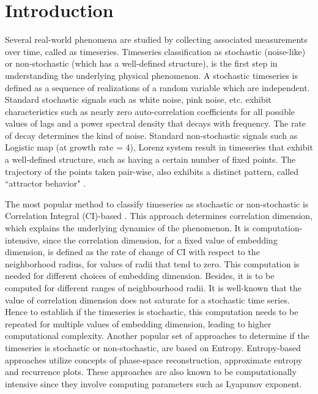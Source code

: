 \documentclass[journal]{IEEEtran}
\begin{document}
	\section{Introduction}
	Several real-world phenomena are studied by collecting associated measurements over time, called as timeseries. Timeseries classification as stochastic (noise-like) or non-stochastic (which has a well-defined structure), is the first step in understanding the underlying physical phenomenon. A stochastic timeseries is defined as a sequence of realizations of a random variable which are independent. Standard stochastic signals such as white noise, pink noise, etc. exhibit characteristics such as nearly zero auto-correlation coefficients for all possible values of lags and a power spectral density that decays with frequency. The rate of decay determines the kind of noise.  Standard non-stochastic signals such as Logistic map (at growth rate = 4), Lorenz system result in timeseries that exhibit a well-defined structure, such as having a certain number of fixed points. The trajectory of the points taken  pair-wise, also exhibits a distinct pattern, called ``attractor behavior" \cite{CIGRacia}.
	
	
	The most popular method to classify timeseries as stochastic or non-stochastic is Correlation Integral (CI)-based \cite{CIGRacia}. This approach determines correlation dimension, which explains the underlying dynamics of the phenomenon. It is computation-intensive, since the correlation dimension, for a fixed value of embedding dimension, is defined as the rate of change of CI with respect to the neighborhood radius, for values of radii that tend to zero. This computation is needed for different choices of embedding dimension. Besides, it is to be computed for  different ranges of neighbourhood radii. It is well-known that the value of correlation dimension does not saturate for a stochastic time series. Hence to establish if the timeseries is stochastic, this computation needs to be repeated for multiple values of embedding dimension, leading to higher computational complexity. Another popular set of approaches to determine if the timeseries is stochastic or non-stochastic, are based on Entropy. Entropy-based approaches \cite{splrecent, russian, Boaretto2021} utilize concepts of phase-space reconstruction, approximate entropy and recurrence plots. These approaches are also known to be computationally intensive since they involve computing parameters such as Lyapunov exponent.
	
\end{document}
